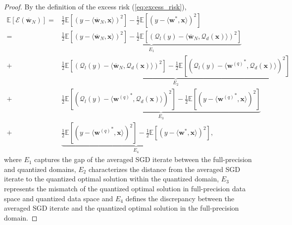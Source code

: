 \documentclass[11pt, letterpaper]{article}
\begin{document}
\begin{proof}
    By the definition of the excess risk (\ref{eq:excess_risk}),
    \begin{equation*}
        \begin{aligned}
            \mathbb{E}[\mathcal{E}(\overline{\mathbf{w}}_N)]
            =&\frac{1}{2}\mathbb{E}\left[\left(y-\langle \overline{\mathbf{w}}_N,\mathbf{x} \rangle \right)^2\right]-\frac{1}{2}\mathbb{E}\left[\left(y-\langle \mathbf{w}^*,\mathbf{x} \rangle \right)^2\right]\\
            =&\underbrace{\frac{1}{2}\mathbb{E}\left[\left(y-\langle \overline{\mathbf{w}}_N,\mathbf{x} \rangle \right)^2\right]-\frac{1}{2}\mathbb{E}\left[(\mathcal{Q}_l(y)-\langle \overline{\mathbf{w}}_N,\mathcal{Q}_d(\mathbf{x})\rangle)^2\right]}_{E_1}\\
            +&\underbrace{\frac{1}{2}\mathbb{E}\left[(\mathcal{Q}_l(y)-\langle \overline{\mathbf{w}}_N,\mathcal{Q}_d(\mathbf{x})\rangle)^2\right]-\frac{1}{2}\mathbb{E}\left[(\mathcal{Q}_l(y)-\langle {\mathbf{w}^{(q)}}^*,\mathcal{Q}_d(\mathbf{x})\rangle)^2\right]}_{E_2}\\
            +&\underbrace{\frac{1}{2}\mathbb{E}\left[(\mathcal{Q}_l(y)-\langle {\mathbf{w}^{(q)}}^*,\mathcal{Q}_d(\mathbf{x})\rangle)^2\right]-\frac{1}{2}\mathbb{E}\left[\left(y-\langle {\mathbf{w}^{(q)}}^*,\mathbf{x} \rangle \right)^2\right]}_{E_3}\\
            +&\underbrace{\frac{1}{2}\mathbb{E}\left[\left(y-\langle {\mathbf{w}^{(q)}}^*,\mathbf{x} \rangle \right)^2\right]-\frac{1}{2}\mathbb{E}\left[\left(y-\langle \mathbf{w}^*,\mathbf{x} \rangle \right)^2\right]}_{E_4},
        \end{aligned}
    \end{equation*}
    where $E_1$ captures the gap of the averaged SGD iterate between the full-precision and quantized domains, $E_2$ characterizes the distance from the averaged SGD iterate to the quantized optimal solution within the quantized domain, $E_3$ represents the mismatch of the quantized optimal solution in full-precision data space and quantized data space and $E_4$ defines the discrepancy between the averaged SGD iterate and the quantized optimal solution in the full-precision domain. 
    

\end{proof}
\end{document}
